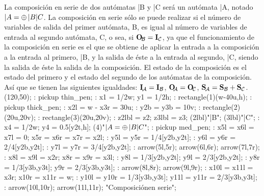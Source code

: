 La composición en serie de dos autómatas |B y |C será un autómata
|A, notado $|A = \srl |B |C$.  La composición en serie sólo se puede
realizar si el número de variables de salida del primer autómata,
\out B, es igual al número de variables de entrada al segundo autómata,
\inp C, o sea, si $\out B = \inp C$, ya que el funcionamiento de la
composición en serie es el que se obtiene de aplicar la entrada a la
composición a la entrada al primero, |B, y la salida de éste a la
entrada al segundo, |C, siendo la salida de éste la salida de la
composición.  El estado de la composición es el estado del primero y el
estado del segundo de los autómatas de la composición.  Así que se
tienen las siguientes igualdades:  $\inpA = \inp B$, $\outA = \out C$,
$\stA = \st B + \st C$.
\MTbeginfigure(120,50);
 \MT: pickup thin_pen;
 \MT: x1 = 1/2w; y1 = 1/2h;
 \MT: rectangle(1)(w-40u,h); %
 \MT: pickup thick_pen;
 \MT: x2l = w - x3r = 30u;
 \MT: y2b = y3b = 10v;
 \MT: rectangle(2)(20u,20v); %
 \MT: rectangle(3)(20u,20v); %
 \MT: z2lbl = z2; z3lbl = z3;
 \MTlabel(2lbl)"|B";
 \MTlabel(3lbl)"|C";
 \MT: x4 = 1/2w; y4 = 0.5[y2t,h];
 \MTlabel(4)"$|A = \srl |B |C$"; %
 \MT: pickup med_pen;
 \MT: x5l = x6l = x7l = 0; x5r = x6r = x7r = x2l;
 \MT: y5l = y5r = 1/4[y2b,y2t];
 \MT: y6l = y6r = 2/4[y2b,y2t];
 \MT: y7l = y7r = 3/4[y2b,y2t];
 \MT: arrow(5l,5r); arrow(6l,6r); arrow(7l,7r); %
 \MT: x8l = x9l = x2r; x8r = x9r = x3l;
 \MT: y8l = 1/3[y2b,y2t]; y9l = 2/3[y2b,y2t];
 \MT: y8r = 1/3[y3b,y3t]; y9r = 2/3[y3b,y3t];
 \MT: arrow(8l,8r); arrow(9l,9r); %
 \MT: x10l = x11l = x3r; x10r = x11r = w;
 \MT: y10l = y10r = 1/3[y3b,y3t]; y11l = y11r = 2/3[y3b,y3t];
 \MT: arrow(10l,10r); arrow(11l,11r); %
\MTendfigure"Composición\cr en serie";

